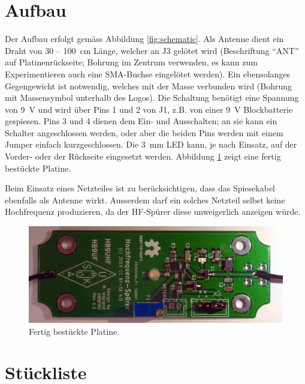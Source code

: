 \documentclass[a4paper,11pt,halfparskip,smallheadings,DIV=10]{scrartcl}
\begin{document}
\section{Aufbau}
Der Aufbau erfolgt gemäss Abbildung \ref{fig:schematic}. Als Antenne dient ein
Draht von 30 -- 100~cm Länge, welcher an J3 gelötet wird (Beschriftung ``ANT''
auf Platinenrückseite; Bohrung im Zentrum verwenden, es kann zum
Experimentieren auch eine SMA-Buchse eingelötet werden). Ein ebensolanges
Gegengewicht ist notwendig, welches mit der Masse verbunden wird (Bohrung mit
Massensymbol unterhalb des Logos). Die Schaltung benötigt eine Spannung von 9~V und wird
über Pins 1 und 2 von J1, z.B. von einer 9~V Blockbatterie gespiesen. Pins 3
und 4 dienen dem Ein- und Ausschalten; an sie kann ein Schalter angeschlossen
werden, oder aber die beiden Pins werden mit einem Jumper einfach
kurzgeschlossen. Die 3~mm LED kann, je nach Einsatz, auf der Vorder- oder der
Rückseite eingesetzt werden.  Abbildung \ref{fig:aufbau} zeigt eine fertig
bestückte Platine.

Beim Einsatz eines Netzteiles ist zu berücksichtigen, dass das Spiesekabel
ebenfalls als Antenne wirkt. Ausserdem darf ein solches Netzteil selbst keine
Hochfrequenz produzieren, da der HF-Spürer diese unweigerlich anzeigen würde.

\begin{figure}[H]
    \begin{center}\includegraphics[width=\textwidth]{foto.png}\end{center}
\caption{Fertig bestückte Platine.}
\label{fig:aufbau}
\end{figure}

\section{Stückliste}
\end{document}
